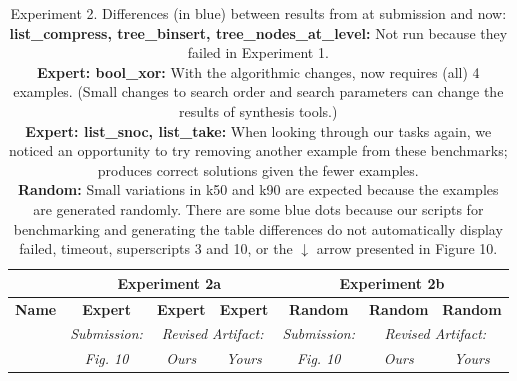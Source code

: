\begin{table}

\experimentTableSize

\begin{tabular}{l|cccccc}
& \multicolumn{3}{c}{\textbf{Experiment 2a}}
& \multicolumn{3}{c}{\textbf{Experiment 2b}} \\\hline
\textbf{Name} &
\textbf{Expert} & \textbf{Expert} & \textbf{Expert} &
\textbf{Random} & \textbf{Random} & \textbf{Random} \\
&
\textit{Submission:} & \multicolumn{2}{c}{\textit{Revised Artifact:}} &
\textit{Submission:} & \multicolumn{2}{c}{\textit{Revised Artifact:}} \\
&
\textit{Fig. 10} & \textit{Ours} & \textit{Yours} &
\textit{Fig. 10} & \textit{Ours} & \textit{Yours} \\

\end{tabular}

\vspace{0.10in}

\caption{Experiment 2.
%
Differences (in blue) between results from \snsMyth{} at submission and
\snsMyth{} now:
%
\experimentCaptionSize
%
\\[3pt]
%
\textbf{list\_compress, tree\_binsert, tree\_nodes\_at\_level:} Not run because
they failed in Experiment 1.
%
\\[3pt]
%
\textbf{Expert: bool\_xor:} With the algorithmic changes, \snsMyth{} now
requires (all) 4 examples.  (Small changes to search order and search parameters
can change the results of synthesis tools.)
%
\\[3pt]
%
\textbf{Expert: list\_snoc, list\_take:} When looking through our tasks again,
we noticed an opportunity to try removing another example from these benchmarks;
\snsMyth{} produces correct solutions given the fewer examples.
%
\\[3pt]
%
\textbf{Random:} Small variations in k50 and k90 are expected because the
examples are generated randomly. There are some blue dots because our scripts
for benchmarking and generating the table differences do not automatically
display {\scriptsize{failed}}, {\scriptsize{timeout}}, superscripts 3 and 10, or
the $\downarrow$ arrow presented in Figure 10.
%
\\[3pt]
%
}

\end{table}
